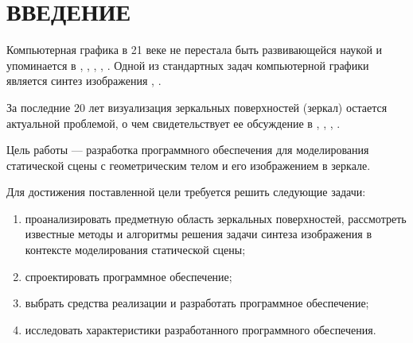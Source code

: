 \chapter*{ВВЕДЕНИЕ}

Компьютерная графика в 21 веке не перестала быть развивающейся наукой и упоминается в \cite{залогова2005компьютерная}, \cite{порев2002компьютерная}, \cite{тозик2013инженерная}, \cite{митин2016компьютерная}, \cite{турлюн2014компьютерная}. 
Одной из стандартных задач компьютерной графики является синтез изображения \cite{порев2002компьютерная}, \cite{куров}.

За последние 20 лет визуализация зеркальных поверхностей (зеркал) остается актуальной проблемой, о чем свидетельствует ее обсуждение в \cite{lensch2005realistic}, \cite{reshetouski2013mirrors}, \cite{miguel2014real}, \cite{hiranyachattada2021demonstration}.

Цель работы --- разработка программного обеспечения для моделирования статической сцены с геометрическим телом и его изображением в зеркале.

Для достижения поставленной цели требуется решить следующие задачи:

\begin{enumerate}
	\item проанализировать предметную область зеркальных поверхностей, рассмотреть известные методы и алгоритмы решения задачи синтеза изображения в контексте моделирования статической сцены;
	\item спроектировать программное обеспечение;
	\item выбрать средства реализации и разработать программное обеспечение;
	\item исследовать характеристики разработанного программного обеспечения.
\end{enumerate}